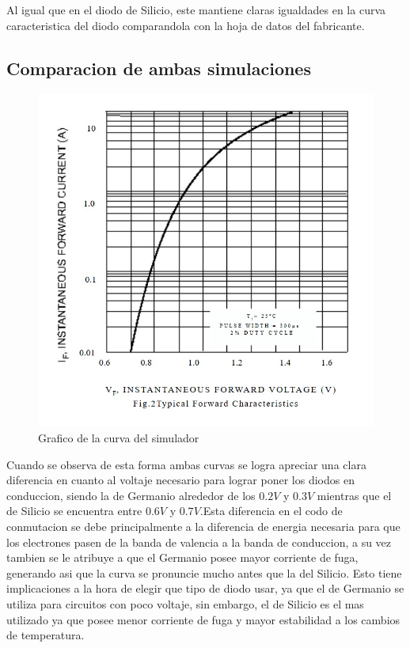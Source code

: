 \documentclass[chaptersright]{informeutn}
\begin{document}
        Al igual que en el diodo de Silicio, este mantiene claras igualdades en la curva caracteristica del diodo
        comparandola con la hoja de datos del fabricante.

      \subsection{Comparacion de ambas simulaciones}

        \begin{figure}[!h]
          \centering
          \begin{minipage}[b]{0.4\textwidth}
            \includegraphics[width=1.1\linewidth]{pictures/Curva_Datash_Si.jpg}
            \caption{Grafico de la curva del simulador}
          \end{minipage}
        \end{figure}

        Cuando se observa de esta forma ambas curvas se logra apreciar una clara diferencia en cuanto al voltaje
        necesario para lograr poner los diodos en conduccion, siendo la de Germanio alrededor de los $0.2V$ y $0.3V$
        mientras que el de Silicio se encuentra entre $0.6V$ y $0.7V$.Esta diferencia en el codo de conmutacion se
        debe principalmente a la diferencia de energia necesaria para que los electrones pasen de la banda de
        valencia a la banda de conduccion, a su vez tambien se le atribuye a que el Germanio posee mayor corriente de
        fuga, generando asi que la curva se pronuncie mucho antes que la del Silicio. Esto tiene implicaciones a la
        hora de elegir que tipo de diodo usar, ya que el de Germanio se utiliza para circuitos con poco voltaje, sin
        embargo, el de Silicio es el mas utilizado ya que posee menor corriente de fuga y mayor estabilidad a los
        cambios de temperatura.
\end{document}
